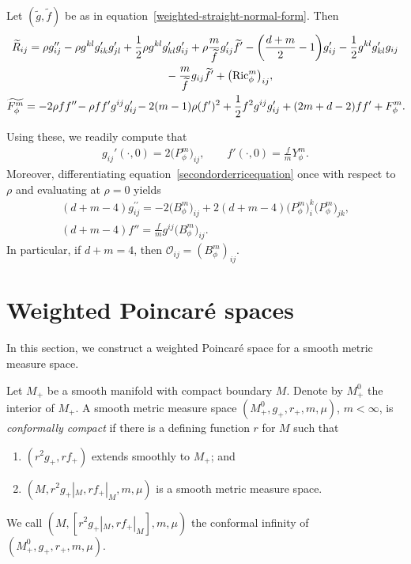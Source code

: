 \documentclass[10pt,a4paper]{amsart}
\numberwithin{equation}{section}
\begin{document}
Let $(\widetilde{g},\widetilde{f})$ be as in equation~\eqref{weighted-straight-normal-form}. Then
\begin{gather}
\widetilde{R}_{ij}=\rho g''_{ij}-\rho g^{kl}g'_{ik}g'_{jl}+\frac{1}{2}\rho g^{kl}g'_{kl}g'_{ij}+\rho\frac{m}{\widetilde{f}} g_{ij}'\widetilde{f}'
-\biggl(\frac{d+m}{2}-1\biggr)g'_{ij}-\frac{1}{2}g^{kl}g'_{kl}g_{ij}\nonumber
\\ \hphantom{\widetilde{R}_{ij}=}
{}-\frac{m}{\widetilde{f}}g_{ij}\widetilde{f}'+\big(\mathrm{Ric}_{\phi}^m\big)_{ij},\nonumber
\\
\widetilde{F_\phi^m}=-2\rho f f''\!-\rho ff'g^{ij}g'_{ij}\!-2(m-1)\rho(f')^2
 +\frac{1}{2}f^2g^{ij}g'_{ij}+(2m+d-2)ff'+F_\phi^m.\!
\label{secondorderricequation}
\end{gather}

Using these, we readily compute that
\begin{align*}
g_{ij}'(\cdot,0)=2 \big(P_\phi^m\big)_{ij},\qquad
f'(\cdot,0)=\frac{f}{m}Y_\phi^m.
\end{align*}
Moreover, differentiating equation~\eqref{secondorderricequation} once with respect to $\rho$ and evaluating at $\rho=0$ yields
\begin{gather*}
(d+m-4) g_{i j}^{\prime \prime}=-2\big(B_\phi^m\big)_{i j}+2(d+m-4) \big(P_\phi^m\big)_{i}^{k} \big(P_\phi^m\big)_{j k},
\\
(d+m-4)f''= \frac{f}{m}g^{ij}\big(B_\phi^m\big)_{ij}.
\end{gather*}
In particular, if $d+m=4$, then $\mathcal{O}_{ij}=(B_\phi^m)_{ij}$.

\section{Weighted Poincar\'e spaces}
\label{sec:poincare}

In this section, we construct a weighted Poincar\'e space for a smooth metric measure space.

Let $M_+$ be a smooth manifold with compact boundary $M$. Denote by $M^0_+$ the interior of $M_+$. A smooth metric measure space $(M^0_+,g_+,r_+,m,\mu)$, $m<\infty$, is \emph{conformally compact} if there is a defining function $r$ for $M$ such that
\begin{enumerate}[label=$(\roman*)$]\itemsep=0pt
 \item $(r^2g_+,rf_+)$ extends smoothly to $M_+$; and
 \item $({M,r^2 g_+}|_{M},{rf_+}|_{M},m,\mu)$ is a smooth metric measure space.
\end{enumerate} We call $(M,[{r^2 g_+}|_{M},{rf_+}|_{M}],m,\mu)$ the conformal infinity of $(M^0_+,g_+,r_+,m,\mu)$.
\end{document}
